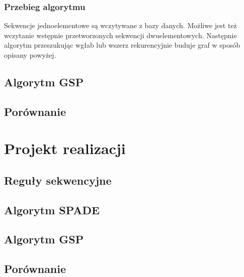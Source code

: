 \documentclass[paper=a4, fontsize=11pt]{scrartcl} %
\numberwithin{equation}{section} %
\numberwithin{figure}{section} %
\numberwithin{table}{section} %
\begin{document}
\subsubsection{Przebieg algorytmu}
Sekwencje jednoelementowe są wczytywane z bazy danych.  Możliwe jest też
wczytanie wstępnie przetworzonych sekwencji dwuelementowych.  Następnie algorytm
przeszukując wgłab lub wszerz rekurencyjnie buduje graf w sposób opisany powyżej.

\subsection{Algorytm GSP}
\subsection{Porównanie}

\section{Projekt realizacji}
\subsection{Reguły sekwencyjne}
\subsection{Algorytm SPADE}
\subsection{Algorytm GSP}
\subsection{Porównanie}
\end{document}
